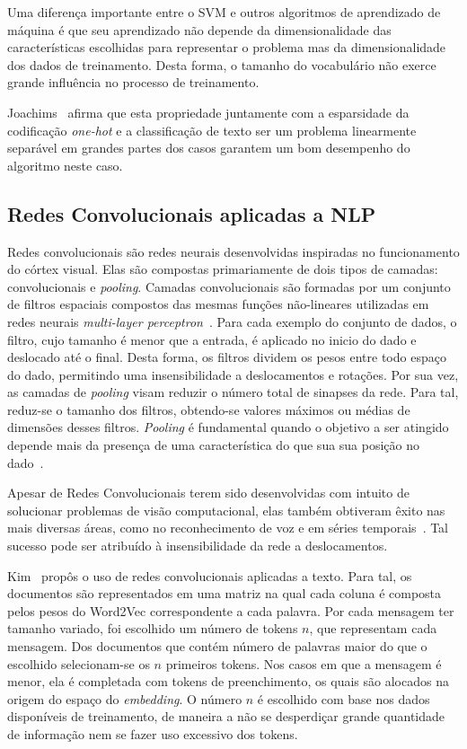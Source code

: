 Uma diferença importante entre o SVM e outros algoritmos de aprendizado de máquina é que seu aprendizado não depende
da dimensionalidade das características escolhidas para representar o problema mas da dimensionalidade dos dados de
treinamento.
Desta forma, o tamanho do vocabulário não exerce grande influência no processo de treinamento.

Joachims~\cite{joachims98} afirma que esta propriedade juntamente com a esparsidade da codificação \textit{one-hot}
e a classificação de texto ser um problema linearmente separável em grandes partes dos casos garantem um bom desempenho
do algoritmo neste caso.

\subsection{Redes Convolucionais aplicadas a NLP}

Redes convolucionais são redes neurais desenvolvidas inspiradas no funcionamento do córtex visual.
Elas são compostas primariamente de dois tipos de camadas: convolucionais e \textit{pooling}.
Camadas convolucionais são formadas por um conjunto de filtros espaciais compostos das mesmas funções não-lineares
utilizadas em redes neurais \textit{multi-layer perceptron}~\cite{goodfellow16}.
Para cada exemplo do conjunto de dados, o filtro, cujo tamanho é menor que a entrada, é aplicado no inicio do dado e
deslocado até o final.
Desta forma, os filtros dividem os pesos entre todo espaço do dado, permitindo uma insensibilidade a deslocamentos e
rotações.
Por sua vez, as camadas de \textit{pooling} visam reduzir o número total de sinapses da rede.
Para tal, reduz-se o tamanho dos filtros, obtendo-se valores máximos ou médias de dimensões desses filtros.
\textit{Pooling} é fundamental quando o objetivo a ser atingido depende mais da presença de uma característica do que
sua sua posição no dado~\cite{goodfellow16}.

Apesar de Redes Convolucionais terem sido desenvolvidas com intuito de solucionar problemas de visão computacional,
elas também obtiveram êxito nas mais diversas áreas, como no reconhecimento de voz e em séries temporais~\cite{lecun95}.
Tal sucesso pode ser atribuído à insensibilidade da rede a deslocamentos.

Kim~\cite{kim14} propôs o uso de redes convolucionais aplicadas a texto.
Para tal, os documentos são representados em uma matriz na qual cada coluna é composta pelos pesos do Word2Vec
correspondente a cada palavra.
Por cada mensagem ter tamanho variado, foi escolhido um número de tokens $n$, que representam cada mensagem.
Dos documentos que contém número de palavras maior do que o escolhido selecionam-se os $n$ primeiros tokens.
Nos casos em que a mensagem é menor, ela é completada com tokens de preenchimento, os quais são alocados na origem do
espaço do \textit{embedding}.
O número $n$ é escolhido com base nos dados disponíveis de treinamento, de maneira a não se desperdiçar grande
quantidade de informação nem se fazer uso excessivo dos tokens.


